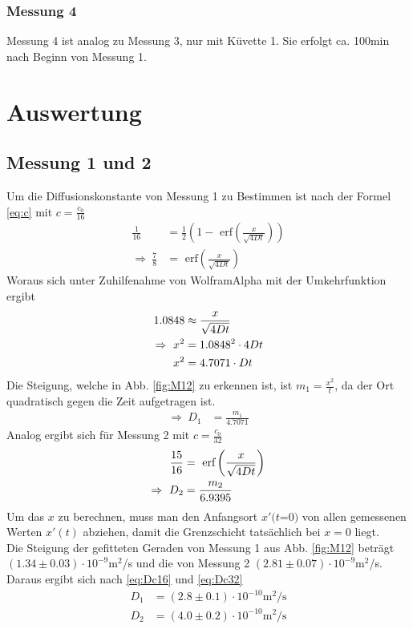 \documentclass[12pt,a4paper,titlepage,headinclude,bibtotoc]{scrartcl}
\newcommand{\erf}[1]{\text{ erf}\ensuremath{\left( #1 \right)}}
\begin{document}
\subsubsection*{Messung 4}
Messung 4 ist analog zu Messung 3, nur mit Küvette 1.
Sie erfolgt ca. 100min nach Beginn von Messung 1.


\section{Auswertung}
\label{sec:auswertung}
\subsection{Messung 1 und 2}
Um die Diffusionskonstante von Messung 1 zu Bestimmen ist nach der Formel \eqref{eq:c} mit $c=\frac{c_0}{16}$
\begin{align*}
 \frac{1}{16}&=\frac{1}{2}\left(1-\erf{\frac{x}{\sqrt{4Dt}}}\right)\\
 \Rightarrow~ \frac{7}{8}&=\erf{\frac{x}{\sqrt{4Dt}}}
\end{align*}Woraus sich unter Zuhilfenahme von WolframAlpha\textsuperscript{\textregistered} mit der Umkehrfunktion ergibt
\begin{align*}
 1.0848&\approx \frac{x}{\sqrt{4Dt}}\notag\\
 \Rightarrow~ x^2&=1.0848^2 \cdot 4Dt\notag\\
 x^2&=4.7071\cdot Dt\notag
\end{align*}
Die Steigung, welche in Abb. \ref{fig:M12} zu erkennen ist, ist $m_1=\frac{x^2}{t}$, da der Ort quadratisch gegen die Zeit aufgetragen ist.
\begin{align}
\Rightarrow ~D_1&=\frac{m_1}{4.7071}\label{eq:Dc16}
\end{align}
Analog ergibt sich für Messung 2 mit $c=\frac{c_0}{32}$
\begin{align}
 \frac{15}{16}&=\erf{\frac{x}{\sqrt{4Dt}}}\notag\\
 \Rightarrow~ D_2&=\frac{m_2}{6.9395}\label{eq:Dc32}
\end{align}
Um das $x$ zu berechnen, muss man den Anfangsort $x'(t$=$0)$ von allen gemessenen Werten $x'(t)$ abziehen, damit die Grenzschicht tatsächlich bei $x=0$ liegt.\\  
Die Steigung der gefitteten Geraden von Messung 1 aus Abb. \ref{fig:M12} beträgt $(1.34\pm 0.03)\cdot 10^{-9}$m$^2$/s und die von Messung 2 $(2.81\pm 0.07)\cdot 10^{-9}$m$^2$/s.
Daraus ergibt sich nach \eqref{eq:Dc16} und \eqref{eq:Dc32}
\begin{align*}
 D_1&= (2.8\pm 0.1)\cdot 10^{-10}\text{m}^2/\text{s}\\
 D_2&= (4.0\pm 0.2)\cdot 10^{-10}\text{m}^2/\text{s}\\
\end{align*}
\end{document}
